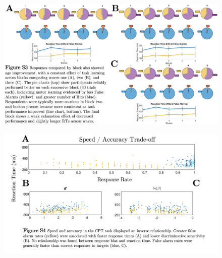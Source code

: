 \documentclass[utf8]{suppmat} %
\begin{document}
\begin{figure}[htbp]
\begin{center}
\includegraphics[width=\textwidth,height=\textheight,keepaspectratio]{Fig-S3}%
\end{center}
\end{figure}

\begin{figure}[htbp]
\begin{center}
\includegraphics[width=\textwidth,height=\textheight,keepaspectratio]{Fig-S4}%
\end{center}
\end{figure}

%
\end{document}
